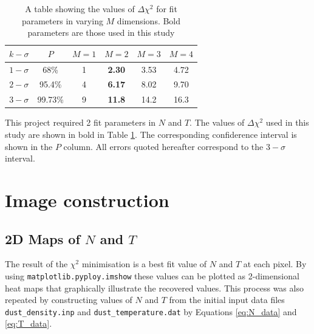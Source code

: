 \documentclass{report}
\begin{document}
\begin{table}[]
\centering
\begin{tabular}{|c|c|cccc}
  \hline
  \textit{\textbf{$k -\sigma$}} & \textit{\textbf{$P$}} & \multicolumn{1}{c|}{\textit{\textbf{$M = 1$}}} & \multicolumn{1}{c|}{\textit{\textbf{$M = 2$}}} & \multicolumn{1}{c|}{\textit{\textbf{$M = 3$}}} & \multicolumn{1}{c|}{\textit{\textbf{$M = 4$}}} \\ \hline
  $1 -\sigma$                   & 68\%                  & 1                                              & \textbf{2.30}                                           & 3.53                                           & 4.72                                           \\ \cline{1-2}
  $2 -\sigma$                   & 95.4\%                & 4                                              & \textbf{6.17}                                           & 8.02                                           & 9.70                                           \\ \cline{1-2}
  $3 -\sigma$                   & 99.73\%               & 9                                              & \textbf{11.8}                                           & 14.2                                           & 16.3                                           \\ \cline{1-2}
  \end{tabular}
  \caption{A table showing the values of $\Delta \chi^{2}$ for fit parameters in varying $M$ dimensions. Bold parameters are those used in this study \parencite{recipes}}
  \label{table:delta}
\end{table}

This project required 2 fit parameters in $N$ and $T$. The values of $\Delta \chi^{2}$ used in this study are shown in bold in Table \ref{table:delta}. The corresponding confiderence interval is shown in the $P$ column. All errors quoted hereafter correspond to the $3 - \sigma$ interval.

\section{Image construction}

\subsection{2D Maps of $N$ and $T$}
The result of the $\chi^{2}$ minimisation is a best fit value of $N$ and $T$ at each pixel. By using \texttt{matplotlib.pyploy.imshow} these values can be plotted as 2-dimensional heat maps that graphically illustrate the recovered values. This process was also repeated by constructing values of $N$ and $T$ from the initial input data files \texttt{dust\_density.inp} and \texttt{dust\_temperature.dat} by Equations \ref{eq:N_data} and \ref{eq:T_data}.
\end{document}
